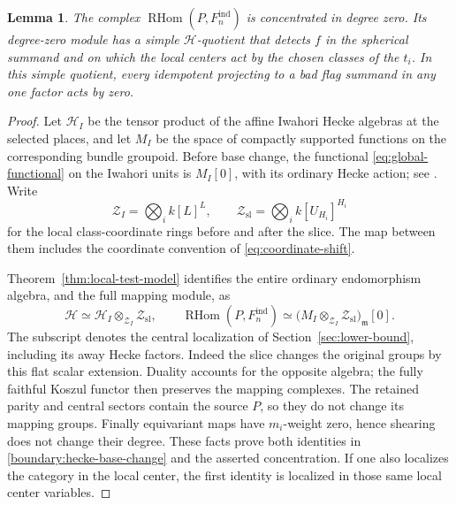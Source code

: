 \documentclass[11pt]{article}
\numberwithin{equation}{section}
\newtheorem{lemma}[theorem]{Lemma}
\theoremstyle{definition}
\theoremstyle{remark}
\newcommand{\RHom}{\operatorname{RHom}}
\begin{document}
\begin{lemma}\label{boundary:simple-quotient}
The complex $\RHom(P,F_n^{\mathrm{ind}})$ is concentrated in degree
zero.  Its degree-zero module has a simple $\mathcal H$-quotient
that detects $f$ in the spherical summand
and on which the local centers act by the chosen classes of the $t_i$.
In this simple quotient, every idempotent projecting to a bad flag
summand in any one factor acts by zero.
\end{lemma}

\begin{proof}
Let $\mathcal H_I$ be the tensor product of the affine Iwahori Hecke
algebras at the selected places, and let $M_I$ be the space of compactly
supported functions on the corresponding bundle groupoid.  Before
base change, the functional \eqref{eq:global-functional} on the
Iwahori units is $M_I[0]$, with its ordinary Hecke action; see
\cite[Section~2, Hecke action and transfer]{Parent}.  Write
\[
 \mathcal Z_I=\bigotimes_i k[L]^L,
 \qquad \mathcal Z_{\mathrm{sl}}
             =\bigotimes_i k[U_{H_i}]^{H_i}
\]
for the local class-coordinate rings before and after the slice.
The map between them includes the coordinate convention of
\eqref{eq:coordinate-shift}.

Theorem~\ref{thm:local-test-model} identifies the entire ordinary
endomorphism algebra, and the full mapping module, as
\begin{equation}\label{boundary:hecke-base-change}
 \mathcal H\simeq
       \mathcal H_I\otimes_{\mathcal Z_I}\mathcal Z_{\mathrm{sl}},
 \qquad
 \RHom(P,F_n^{\mathrm{ind}})
       \simeq
       \bigl(M_I\otimes_{\mathcal Z_I}\mathcal Z_{\mathrm{sl}}
                    \bigr)_{\mathfrak m}[0].
\end{equation}
The subscript denotes the central localization of
Section~\ref{sec:lower-bound}, including its away Hecke factors.
Indeed the slice changes the original groups by this flat scalar
extension.  Duality accounts for the opposite algebra; the fully
faithful Koszul functor then preserves the mapping complexes.  The
retained parity and central sectors contain the source $P$, so they do
not change its mapping groups.  Finally equivariant maps have
$m_i$-weight zero, hence shearing does not change their degree.
These facts prove both identities in \eqref{boundary:hecke-base-change}
and the asserted concentration.  If one also localizes the category in
the local center, the first identity is localized in those same local
center variables.


\end{proof}
\end{document}
